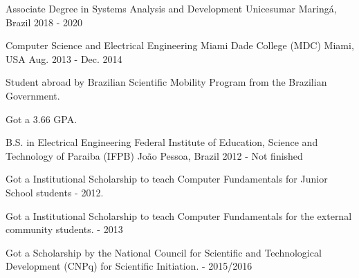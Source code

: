 

\begin{cventries}

  \cventry
    {Associate Degree in Systems Analysis and Development} %
    {Unicesumar} %
    {Maringá, Brazil} %
    {2018 - 2020} %
    {
    }
  
  \cventry
    {Computer Science and Electrical Engineering} %
    {Miami Dade College (MDC)} %
    {Miami, USA} %
    {Aug. 2013 - Dec. 2014} %
    {
		\begin{cvitems} %
          \item {Student abroad by Brazilian Scientific Mobility Program from the Brazilian Government.}
          \item {Got a 3.66 GPA.}
        \end{cvitems} 
    }

  
  \cventry
    {B.S. in Electrical Engineering} %
    {Federal Institute of Education, Science and Technology of Paraiba (IFPB)} %
    {João Pessoa, Brazil} %
    {2012 - Not finished} %
    {
      \begin{cvitems} %
        \item {Got a Institutional Scholarship to teach Computer Fundamentals for Junior School students - 2012.}
        \item {Got a Institutional Scholarship to teach Computer Fundamentals for the external community students. - 2013}
        \item {Got a Scholarship by the National Council for Scientific and Technological Development (CNPq) for Scientific Initiation. - 2015/2016}
      \end{cvitems}
    }
    
\end{cventries}
